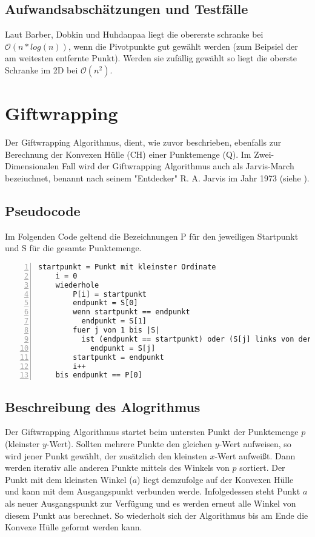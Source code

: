 \documentclass[Labor, MSC, german]{twbook}
\begin{document}
\subsection{Aufwandsabschätzungen und Testfälle}
Laut Barber, Dobkin und Huhdanpaa \cite{10.1145/235815.235821} liegt die obererste schranke bei $\mathcal{O}(n * log( n))$, wenn die Pivotpunkte gut gewählt werden (zum Beipsiel der am weitesten entfernte Punkt). Werden sie zufällig gewählt so liegt die oberste Schranke im 2D bei $\mathcal{O}(n^2)$.



\section{Giftwrapping}
Der Giftwrapping Algorithmus, dient, wie zuvor beschrieben, ebenfalls zur Berechnung der Konvexen Hülle (CH) einer Punktemenge (Q). Im Zwei-Dimensionalen Fall wird der Giftwrapping Algorithmus auch als Jarvis-March bezeiuchnet, benannt nach seinem "Entdecker"  R. A. Jarvis im Jahr 1973 (siehe \cite{JARVIS197318}).

\subsection{Pseudocode}
Im Folgenden Code geltend die Bezeichnungen P für den jeweiligen Startpunkt und S für die gesamte Punktemenge.

\begin{lstlisting}[language=PseudoCode,numbers=left, breaklines=true, caption={Giftwrapping Pseudocode \cite{Wikipedia_GiftWrapping}}]
    startpunkt = Punkt mit kleinster Ordinate
    i = 0
    wiederhole
        P[i] = startpunkt
        endpunkt = S[0]
        wenn startpunkt == endpunkt
          endpunkt = S[1]
        fuer j von 1 bis |S|
          ist (endpunkt == startpunkt) oder (S[j] links von der Geraden zwischen startpunkt und endpunkt)
            endpunkt = S[j]
        startpunkt = endpunkt
        i++
    bis endpunkt == P[0]
\end{lstlisting}

    
\subsection{Beschreibung des Alogrithmus}
Der Giftwrapping Algorithmus startet beim untersten Punkt der Punktemenge $p$ (kleinster $y$-Wert). Sollten mehrere Punkte den gleichen $y$-Wert aufweisen, so wird jener Punkt gewählt, der zusätzlich den kleinsten $x$-Wert aufweißt. Dann werden iterativ alle anderen Punkte mittels des Winkels von $p$ sortiert. Der Punkt mit dem kleinsten Winkel ($a$) liegt demzufolge auf der Konvexen Hülle und kann mit dem Ausgangspunkt verbunden werde. Infolgedessen steht Punkt $a$ als neuer Ausgangspunkt zur Verfügung und es werden erneut alle Winkel von diesem Punkt aus berechnet. So wiederholt sich der Algorithmus bis am Ende die Konvexe Hülle geformt werden kann.\\
\end{document}
